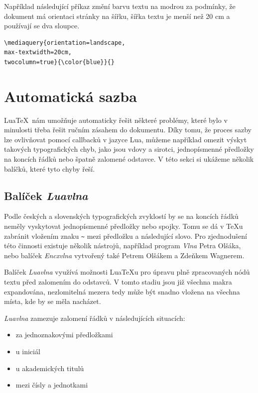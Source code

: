 \documentclass{csbulletin}
\newcommand\balicek[1]{\textit{#1}}
\begin{document}
Například následující příkaz změní barvu textu na modrou za podmínky, že dokument 
má orientaci stránky na šířku, šířka textu je menší než 20 cm a používají se dva sloupce.

\begin{verbatim}
\mediaquery{orientation=landscape,
max-textwidth=20cm,
twocolumn=true}{\color{blue}}{}
\end{verbatim}


\section{Automatická sazba}

Lua\TeX\ nám umožňuje automaticky řešit některé problémy, které bylo v
minulosti třeba řešit ručním zásahem do dokumentu. Díky tomu, že proces sazby
lze ovlivňovat pomocí callbacků v jazyce Lua, můžeme například omezit výskyt
takových typografických chyb, jako jsou vdovy a sirotci, jednopísmenné předložky
na koncích řádků nebo špatně zalomené odstavce. V této sekci si ukážeme
několik balíčků, které tyto chyby řeší.





\subsection{Balíček \balicek{Luavlna}}

Podle českých a slovenských typografických zvyklostí by se na koncích řádků
neměly vyskytovat jednopísmenné předložky nebo spojky. 
Tomu se dá v \TeX u zabránit vložením znaku \verb|~| mezi předložku a
následující slovo. Pro zjednodušení této činnosti existuje
několik nástrojů, například program \balicek{Vlna} Petra Olšáka, nebo balíček
\balicek{Encxvlna} vytvořený také Petrem Olšákem a Zdeňkem Wagnerem.

Balíček \balicek{Luavlna} \cite{luavlna} využívá možnosti Lua\TeX u pro úpravu
plně zpracovaných nódů textu před zalomením do odstavců. 
V tomto stadiu jsou již všechna makra expandována, nezlomitelná mezera
tedy může být snadno vložena na všechna místa, kde by se měla nacházet.

\balicek{Luavlna} zamezuje zalomení řádků v následujících situacích:

\begin{itemize}
  \item za jednoznakovými předložkami
  \item u iniciál
  \item u akademických titulů
  \item mezi čísly a jednotkami
\end{itemize}
  
\end{document}
